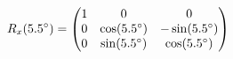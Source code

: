 \documentclass[preview]{standalone}
\begin{document}
\begin{align*}
\special{dvisvgm:raw <g id='unique000'>}R_x(5.5^\circ) = \begin{pmatrix} 1 & 0 & 0 \\ 0 & \cos(5.5^\circ) & -\sin(5.5^\circ) \\ 0 & \sin(5.5^\circ) & \cos(5.5^\circ) \end{pmatrix}\special{dvisvgm:raw </g>}
\end{align*}
\end{document}
